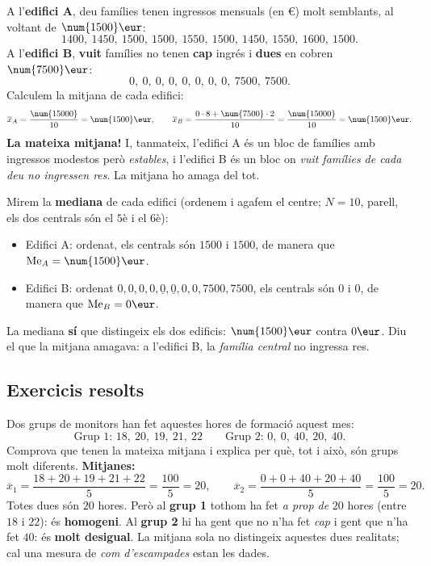 \begin{exemple}
A l'\textbf{edifici A}, deu famílies tenen ingressos mensuals (en €) molt semblants,
al voltant de $\num{1500}\eur$:
\[
\num{1400},\ \num{1450},\ \num{1500},\ \num{1500},\ \num{1550},\ \num{1500},\ \num{1450},\ \num{1550},\ \num{1600},\ \num{1500}.
\]
A l'\textbf{edifici B}, \textbf{vuit} famílies no tenen \textbf{cap} ingrés i \textbf{dues}
en cobren $\num{7500}\eur$:
\[
0,\ 0,\ 0,\ 0,\ 0,\ 0,\ 0,\ 0,\ \num{7500},\ \num{7500}.
\]
Calculem la mitjana de cada edifici:
\[
\overline{x}_A=\frac{\num{15000}}{10}=\num{1500}\eur,\qquad
\overline{x}_B=\frac{0\cdot 8+\num{7500}\cdot 2}{10}=\frac{\num{15000}}{10}=\num{1500}\eur.
\]
\textbf{La mateixa mitjana!} I, tanmateix, l'edifici A és un bloc de famílies amb
ingressos modestos però \emph{estables}, i l'edifici B és un bloc on \emph{vuit
famílies de cada deu no ingressen res}. La mitjana ho amaga del tot.
\end{exemple}

\begin{exemple}
Mirem la \textbf{mediana} de cada edifici (ordenem i agafem el centre; $N=10$,
parell, els dos centrals són el $5$è i el $6$è):
\begin{itemize}[leftmargin=1.4em, itemsep=2pt]
  \item Edifici A: ordenat, els centrals són $\num{1500}$ i $\num{1500}$, de manera
        que $\text{Me}_A=\num{1500}\eur$.
  \item Edifici B: ordenat $0,0,0,0,\underline{0},\underline{0},0,0,\num{7500},\num{7500}$,
        els centrals són $0$ i $0$, de manera que $\text{Me}_B=0\eur$.
\end{itemize}
La mediana \textbf{sí} que distingeix els dos edificis: $\num{1500}\eur$ contra $0\eur$.
Diu el que la mitjana amagava: a l'edifici B, la \emph{família central} no ingressa
res.
\end{exemple}

\subsection{Exercicis resolts}

\begin{exresolt}
Dos grups de monitors han fet aquestes hores de formació aquest mes:
\[
\text{Grup 1: } 18,\ 20,\ 19,\ 21,\ 22 \qquad
\text{Grup 2: } 0,\ 0,\ 40,\ 20,\ 40.
\]
Comprova que tenen la mateixa mitjana i explica per què, tot i això, són grups molt
diferents.
\solucio
\textbf{Mitjanes:}
\[
\overline{x}_1=\frac{18+20+19+21+22}{5}=\frac{100}{5}=20,\qquad
\overline{x}_2=\frac{0+0+40+20+40}{5}=\frac{100}{5}=20.
\]
Totes dues són $20$ hores. Però al \textbf{grup 1} tothom ha fet \emph{a prop de}
$20$ hores (entre $18$ i $22$): és \textbf{homogeni}. Al \textbf{grup 2} hi ha gent
que no n'ha fet \emph{cap} i gent que n'ha fet $40$: és \textbf{molt desigual}. La
mitjana sola no distingeix aquestes dues realitats; cal una mesura de \emph{com
d'escampades} estan les dades.
\end{exresolt}

